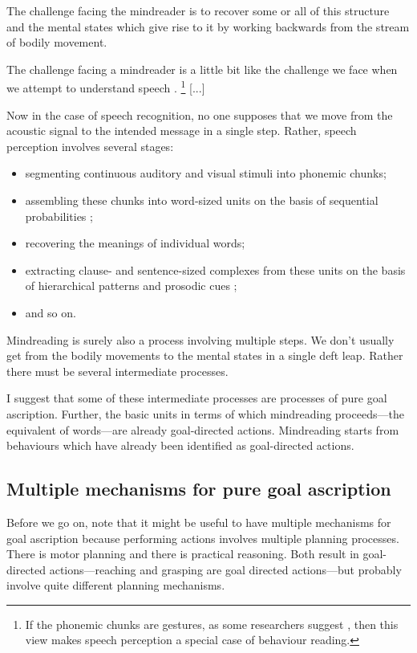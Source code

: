 \documentclass[12pt,\papersize]{extarticle}
\begin{document}
The challenge facing the mindreader is to recover some or all of this structure and the mental states which give rise to it by working backwards from the stream of bodily movement.  

The challenge facing a mindreader is a little bit like the challenge we face when we attempt to understand speech \citep{Baird:2001mb,Baldwin:2001rs}.%
\footnote{
	If the phonemic chunks are gestures, as some researchers suggest \citep[]{Browman:1992da, Liberman:2000gr}, then this view makes speech perception a special case of behaviour reading.}
[...]

Now in the case of speech recognition, no one supposes that we move from the acoustic signal to the intended message in a single step.
Rather, speech perception involves several stages: 
\begin{itemize}
\item 
segmenting continuous auditory and visual stimuli into phonemic chunks; 
\item 
assembling these chunks into word-sized units on the basis of sequential probabilities \citep[]{Saffran:1996aj}; 
\item 
recovering the meanings of individual words;
\item
 extracting clause- and sentence-sized complexes from these units on the basis of hierarchical patterns and prosodic cues \citep[]{Newport:2004wi, Soderstrom:2005zy}; 
\item
and so on.
\end{itemize}


Mindreading is surely also a process involving multiple steps.
We don't usually get from the bodily movements to the mental states in a single deft leap.
Rather there must be several intermediate processes.

I suggest that some of these intermediate processes are processes of pure goal ascription. 
Further, the basic units in terms of which mindreading proceeds---the equivalent of words---are already goal-directed actions.
Mindreading starts from behaviours which have already been identified as goal-directed actions.


\subsection{Multiple mechanisms for pure goal ascription}
Before we go on, note that it might be useful to have multiple mechanisms for goal ascription because performing actions involves multiple planning processes.
There is motor planning and there is practical reasoning.
Both result in goal-directed actions---reaching and grasping are goal directed actions---but probably involve quite different planning mechanisms.
\end{document}
